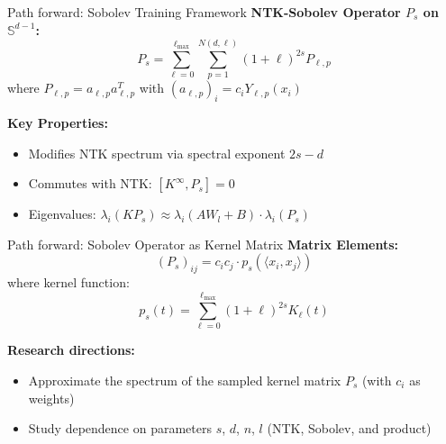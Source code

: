 \documentclass{beamer}
\begin{document}
\begin{frame}{Path forward: Sobolev Training Framework}
\textbf{NTK-Sobolev Operator $P_s$ on $\mathbb{S}^{d-1}$:}
\[ P_s = \sum_{\ell=0}^{\ell_{\max}} \sum_{p=1}^{N(d,\ell)} (1+\ell)^{2s}P_{\ell,p} \]
where $P_{\ell,p} = a_{\ell,p}a_{\ell,p}^T$ with $(a_{\ell,p})_i = c_iY_{\ell,p}(x_i)$

\textbf{Key Properties:}
\begin{itemize}
\item Modifies NTK spectrum via spectral exponent $2s-d$
\item Commutes with NTK: $[K^{\infty}, P_s] = 0$ 
\item Eigenvalues: $\lambda_i(K P_s) \approx \lambda_i(A W_l + B) \cdot \lambda_i(P_s)$
\end{itemize}
\end{frame}

\begin{frame}{Path forward: Sobolev Operator as Kernel Matrix}
\textbf{Matrix Elements:}
\[ (P_s)_{ij} = c_i c_j \cdot p_s(\langle x_i, x_j \rangle) \]
where kernel function:
\[ p_s(t) = \sum_{\ell=0}^{\ell_{\max}} (1+\ell)^{2s} K_\ell(t) \]

\textbf{ Research directions:}
\begin{itemize}
\item Approximate the spectrum of the sampled kernel matrix $P_s$ (with $c_i$ as weights)
\item Study dependence on parameters $s$, $d$, $n$, $l$ (NTK, Sobolev, and product)
\end{itemize}
\end{frame}
\end{document}
